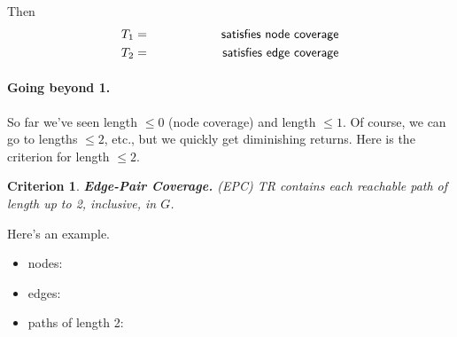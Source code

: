 \documentclass[11pt]{article}
\newtheorem{crit}{Criterion}
\begin{document}
Then 
\begin{eqnarray*}
T_1 &=& \hspace*{5em} \mbox{\sf satisfies node coverage}\\
T_2 &=& \hspace*{5em} \mbox{\sf satisfies edge coverage}
\end{eqnarray*}

\paragraph{Going beyond 1.} So far we've seen length $\le 0$ (node coverage)
and length $\le 1$. Of course, we can go to lengths $\le 2$, etc., but
we quickly get diminishing returns. Here is the criterion for length $\le 2$.

\begin{crit}
{\bf Edge-Pair Coverage.} (EPC) TR contains each reachable path of length
up to 2, inclusive, in $G$.
\end{crit}

Here's an example.
\begin{center}
\end{center}

\begin{itemize}
\item {\sf nodes:}
\item {\sf edges:}
\item {\sf paths of length 2: }
\end{itemize}
\end{document}
